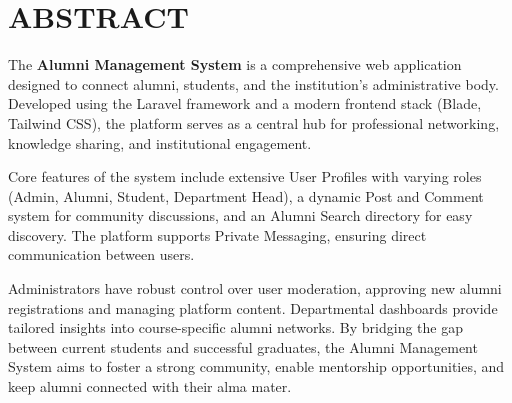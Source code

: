 \chapter*{ABSTRACT}
\vspace{1cm}

The \textbf{Alumni Management System} is a comprehensive web application designed to connect alumni, students, and the institution's administrative body. Developed using the Laravel framework and a modern frontend stack (Blade, Tailwind CSS), the platform serves as a central hub for professional networking, knowledge sharing, and institutional engagement.

Core features of the system include extensive User Profiles with varying roles (Admin, Alumni, Student, Department Head), a dynamic Post and Comment system for community discussions, and an Alumni Search directory for easy discovery. The platform supports Private Messaging, ensuring direct communication between users.

Administrators have robust control over user moderation, approving new alumni registrations and managing platform content. Departmental dashboards provide tailored insights into course-specific alumni networks. By bridging the gap between current students and successful graduates, the Alumni Management System aims to foster a strong community, enable mentorship opportunities, and keep alumni connected with their alma mater.

